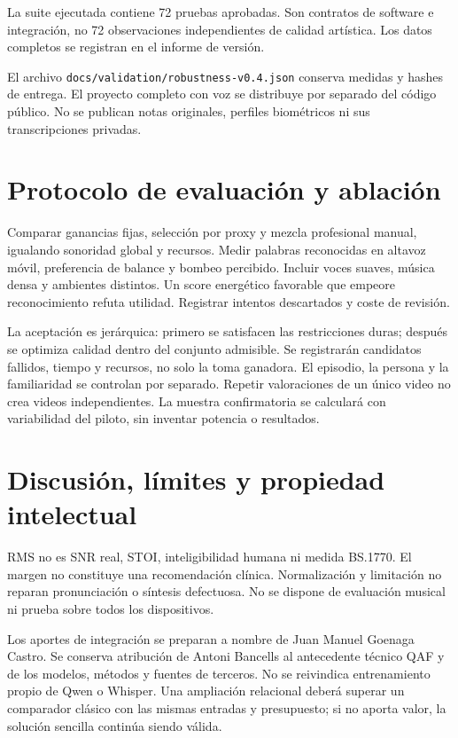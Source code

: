 \documentclass[10pt,a4paper]{article}
\begin{document}
La suite ejecutada contiene 72 pruebas aprobadas. Son contratos de software e integración, no 72 observaciones independientes de calidad artística. Los datos completos se registran en el informe de versión.

El archivo \texttt{docs/validation/robustness-v0.4.json} conserva medidas y hashes de entrega. El proyecto completo con voz se distribuye por separado del código público. No se publican notas originales, perfiles biométricos ni sus transcripciones privadas.
\section{Protocolo de evaluación y ablación}
Comparar ganancias fijas, selección por proxy y mezcla profesional manual, igualando sonoridad global y recursos. Medir palabras reconocidas en altavoz móvil, preferencia de balance y bombeo percibido. Incluir voces suaves, música densa y ambientes distintos. Un score energético favorable que empeore reconocimiento refuta utilidad. Registrar intentos descartados y coste de revisión.

La aceptación es jerárquica: primero se satisfacen las restricciones duras; después se optimiza calidad dentro del conjunto admisible. Se registrarán candidatos fallidos, tiempo y recursos, no solo la toma ganadora. El episodio, la persona y la familiaridad se controlan por separado. Repetir valoraciones de un único video no crea videos independientes. La muestra confirmatoria se calculará con variabilidad del piloto, sin inventar potencia o resultados.
\section{Discusión, límites y propiedad intelectual}
RMS no es SNR real, STOI, inteligibilidad humana ni medida BS.1770. El margen no constituye una recomendación clínica. Normalización y limitación no reparan pronunciación o síntesis defectuosa. No se dispone de evaluación musical ni prueba sobre todos los dispositivos.

Los aportes de integración se preparan a nombre de Juan Manuel Goenaga Castro. Se conserva atribución de Antoni Bancells al antecedente técnico QAF y de los modelos, métodos y fuentes de terceros. No se reivindica entrenamiento propio de Qwen o Whisper. Una ampliación relacional deberá superar un comparador clásico con las mismas entradas y presupuesto; si no aporta valor, la solución sencilla continúa siendo válida.
\end{document}
